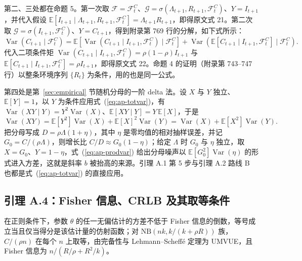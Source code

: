 第二、三处都在命题 5。第一次取 $\mathcal F=\mathcal F_t^C$、$\mathcal G=\sigma(\Lambda_{t+1},R_{t+1},\mathcal F_t^C)$、$Y=I_{t+1}$，并代入假设 $\mathbb{E}[I_{t+1}\mid\Lambda_{t+1},R_{t+1},\mathcal F_t^C]=\Lambda_{t+1}R_{t+1}$，即得原文式 21。第二次取 $\mathcal G=\sigma(I_{t+1},\mathcal F_t^C)$、$Y=C_{t+1}$，得到附录第 769 行的分解，如下式所示：
\begin{equation*}
\operatorname{Var}(C_{t+1} \mid \mathcal{F}_t^C) = \mathbb{E}[\operatorname{Var}(C_{t+1} \mid I_{t+1}, \mathcal{F}_t^C) \mid \mathcal{F}_t^C] + \operatorname{Var}(\mathbb{E}[C_{t+1} \mid I_{t+1}, \mathcal{F}_t^C] \mid \mathcal{F}_t^C).
\tag*{原文第 769 行}
\end{equation*}
代入二项条件矩 $\operatorname{Var}(C_{t+1}\mid I_{t+1},\mathcal F_t^C)=\rho(1-\rho)I_{t+1}$ 与 $\mathbb{E}[C_{t+1}\mid I_{t+1},\mathcal F_t^C]=\rho I_{t+1}$，即得原文式 22。命题 4 的证明（附录第 743--747 行）以整条环境序列 $\{R_t\}$ 为条件，用的也是同一公式。

第四处是第~\ref{sec:empirical} 节随机分母的一阶 delta 法。设 $X$ 与 $Y$ 独立、$\mathbb{E}[Y]=1$，以 $Y$ 为条件应用式~(\ref{eq:ap-totvar})，有 $\operatorname{Var}(XY\mid Y)=Y^2\operatorname{Var}(X)$、$\mathbb{E}[XY\mid Y]=Y\,\mathbb{E}[X]$，于是
\begin{equation}\label{eq:ap-prodvar}
\operatorname{Var}(XY)=\mathbb{E}[Y^2]\operatorname{Var}(X)+\mathbb{E}[X]^2\operatorname{Var}(Y)=\operatorname{Var}(X)+\mathbb{E}[X^2]\operatorname{Var}(Y).
\end{equation}
把分母写成 $D=\rho\Lambda(1+\eta)$，其中 $\eta$ 是零均值的相对抽样误差，并记 $G_0=C/(\rho\Lambda)$，则增长比 $C/D\approx G_0(1-\eta)$；给定 $\Lambda$ 时 $G_0$ 与 $\eta$ 独立，取 $X=G_0$、$Y=1-\eta$，式~(\ref{eq:ap-prodvar}) 给出分母噪声以 $\mathbb{E}[G_0^2]\operatorname{Var}(\eta)$ 的形式进入方差，这就是斜率 $b$ 被抬高的来源。引理 A.1 第 5 步与引理 A.2 路线 B 也都是式~(\ref{eq:ap-totvar}) 的直接应用。

\subsection{引理 A.4：Fisher 信息、CRLB 及其取等条件}\label{lem:ap-fisher}

在正则条件下，参数 $\theta$ 的任一无偏估计的方差不低于 Fisher 信息的倒数，等号成立当且仅当得分是该估计量的仿射函数；对 $\mathrm{NB}(nk,k/(k+\rho R))$ 族，$C/(\rho n)$ 在每个 $n$ 上取等，由完备性与 Lehmann--Scheffé 定理为 UMVUE，且 Fisher 信息为 $n/(R/\rho+R^2/k)$。

